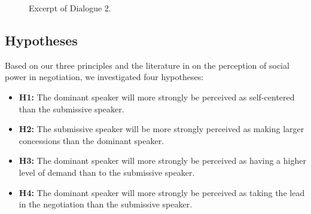 \documentclass{llncs}
\begin{document}
	
	\begin{figure}
		
		\caption{\label{fig:ex-dialogue}Excerpt of Dialogue 2.}
	\end{figure}
			\vspace{-1em} 
	\subsection{Hypotheses}
		\vspace{-.5em} 
	Based on our three principles and the literature in on the perception of social power in negotiation, we investigated four hypotheses:
	\vspace{-.5em} 
	\begin{itemize}
		\item  \textbf{H1:} The dominant speaker will more strongly be perceived as self-centered than the submissive speaker.  
		
		\item \textbf{H2:} The submissive speaker will be more strongly perceived as making larger concessions than the dominant speaker.
		
		\item \textbf{H3:}  The dominant speaker will more strongly be perceived as having a higher level of demand than to the submissive speaker.
		
		\item \textbf{H4:}  The dominant speaker will more strongly be perceived as taking the lead in the negotiation than the submissive speaker.
		
	\end{itemize}
	
\end{document}
